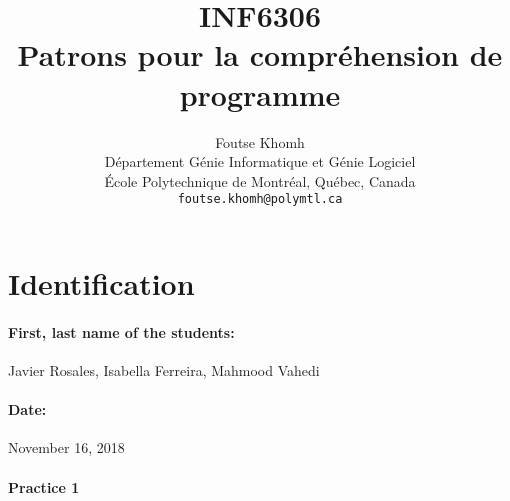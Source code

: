 \documentclass[11pt]{article}
\title{INF6306\\Patrons pour la compr\'{e}hension de programme}
\author{
    Foutse Khomh \\
    D\'{e}partement G\'{e}nie Informatique et G\'{e}nie Logiciel \\
    \'{E}cole Polytechnique de Montr\'{e}al, Qu\'{e}bec, Canada \\
    \texttt{foutse.khomh@polymtl.ca}
}
\date{}
\def\titre{}
\def\auteur{}
\begin{document}
\maketitle

\section{Identification}

\paragraph{First, last name of the students:} Javier Rosales, Isabella Ferreira, Mahmood Vahedi\auteur 
\paragraph{Date:} November 16, 2018

\paragraph{Practice 1}\titre







\end{document}
